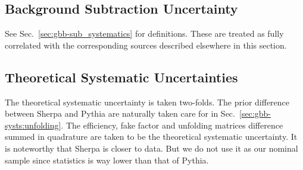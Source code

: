 \begin{enumerate}
  
\end{enumerate}

\subsection{Background Subtraction Uncertainty}
\label{sec:gbb-systs:background}

See Sec.~\ref{sec:gbb-sub_systematics} for definitions. These are treated as fully correlated with the corresponding sources described elsewhere in this section.%
  

\subsection{Theoretical Systematic Uncertainties}
\label{sec:gbb-systs:theory}

The theoretical systematic uncertainty is taken two-folds. The prior difference between Sherpa and Pythia are naturally taken care for in Sec.~\ref{sec:gbb-systs:unfolding}. The efficiency, fake factor and unfolding matrices difference summed in quadrature are taken to be the theoretical systematic uncertainty. It is noteworthy that Sherpa is closer to data. But we do not use it as our nominal sample since statistics is way lower than that of Pythia.

